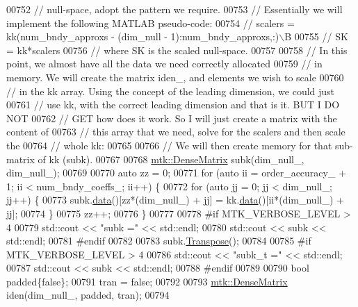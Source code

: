 \begin{DoxyCode}
{{00752   \textcolor{comment}{// null-space, adopt the pattern we require.}
00753   \textcolor{comment}{// Essentially we will implement the following MATLAB pseudo-code:}
00754   \textcolor{comment}{//  scalers = kk(num\_bndy\_approxs - (dim\_null - 1):num\_bndy\_approxs,:)\(\backslash\)B}
00755   \textcolor{comment}{//  SK = kk*scalers}
00756   \textcolor{comment}{// where SK is the scaled null-space.}
00757 
00758   \textcolor{comment}{// In this point, we almost have all the data we need correctly allocated}
00759   \textcolor{comment}{// in memory. We will create the matrix iden\_, and elements we wish to scale}
00760   \textcolor{comment}{// in the kk array. Using the concept of the leading dimension, we could just}
00761   \textcolor{comment}{// use kk, with the correct leading dimension and that is it. BUT I DO NOT}
00762   \textcolor{comment}{// GET how does it work. So I will just create a matrix with the content of}
00763   \textcolor{comment}{// this array that we need, solve for the scalers and then scale the}
00764   \textcolor{comment}{// whole kk:}
00765 
00766   \textcolor{comment}{// We will then create memory for that sub-matrix of kk (subk).}
00767 
00768   \hyperlink{classmtk_1_1DenseMatrix}{mtk::DenseMatrix} subk(dim\_null\_, dim\_null\_);
00769 
00770   \textcolor{keyword}{auto} zz = 0;
00771   \textcolor{keywordflow}{for} (\textcolor{keyword}{auto} ii = order\_accuracy\_ + 1; ii < num\_bndy\_coeffs\_; ii++) \{
00772     \textcolor{keywordflow}{for} (\textcolor{keyword}{auto} jj = 0; jj < dim\_null\_; jj++) \{
00773       subk.\hyperlink{classmtk_1_1DenseMatrix_a0c33b8a9e01d157c61ddbdf807c25d84}{data}()[zz*(dim\_null\_) + jj] = kk.\hyperlink{classmtk_1_1DenseMatrix_a0c33b8a9e01d157c61ddbdf807c25d84}{data}()[ii*(dim\_null\_) + jj];
00774     \}
00775     zz++;
00776   \}
00777 
00778 \textcolor{preprocessor}{  #if MTK\_VERBOSE\_LEVEL > 4}
00779   std::cout << \textcolor{stringliteral}{"subk ="} << std::endl;
00780   std::cout << subk << std::endl;
00781 \textcolor{preprocessor}{  #endif}
00782 
00783   subk.\hyperlink{classmtk_1_1DenseMatrix_a71d9c07ca66e88d97d1fd5012f43138b}{Transpose}();
00784 
00785 \textcolor{preprocessor}{  #if MTK\_VERBOSE\_LEVEL > 4}
00786   std::cout << \textcolor{stringliteral}{"subk\_t ="} << std::endl;
00787   std::cout << subk << std::endl;
00788 \textcolor{preprocessor}{  #endif}
00789 
00790   \textcolor{keywordtype}{bool} padded\{\textcolor{keyword}{false}\};
00791   tran = \textcolor{keyword}{false};
00792 
00793   \hyperlink{classmtk_1_1DenseMatrix}{mtk::DenseMatrix} iden(dim\_null\_, padded, tran);
00794 
}}
\end{DoxyCode}
